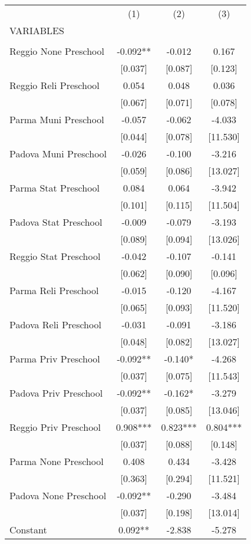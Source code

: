 \begin{tabular}{lccc} \hline
 & (1) & (2) & (3) \\
VARIABLES &  &  &  \\ \hline
 &  &  &  \\
Reggio None Preschool & -0.092** & -0.012 & 0.167 \\
 & [0.037] & [0.087] & [0.123] \\
Reggio Reli Preschool & 0.054 & 0.048 & 0.036 \\
 & [0.067] & [0.071] & [0.078] \\
Parma Muni Preschool & -0.057 & -0.062 & -4.033 \\
 & [0.044] & [0.078] & [11.530] \\
Padova Muni Preschool & -0.026 & -0.100 & -3.216 \\
 & [0.059] & [0.086] & [13.027] \\
Parma Stat Preschool & 0.084 & 0.064 & -3.942 \\
 & [0.101] & [0.115] & [11.504] \\
Padova Stat Preschool & -0.009 & -0.079 & -3.193 \\
 & [0.089] & [0.094] & [13.026] \\
Reggio Stat Preschool & -0.042 & -0.107 & -0.141 \\
 & [0.062] & [0.090] & [0.096] \\
Parma Reli Preschool & -0.015 & -0.120 & -4.167 \\
 & [0.065] & [0.093] & [11.520] \\
Padova Reli Preschool & -0.031 & -0.091 & -3.186 \\
 & [0.048] & [0.082] & [13.027] \\
Parma Priv Preschool & -0.092** & -0.140* & -4.268 \\
 & [0.037] & [0.075] & [11.543] \\
Padova Priv Preschool & -0.092** & -0.162* & -3.279 \\
 & [0.037] & [0.085] & [13.046] \\
Reggio Priv Preschool & 0.908*** & 0.823*** & 0.804*** \\
 & [0.037] & [0.088] & [0.148] \\
Parma None Preschool & 0.408 & 0.434 & -3.428 \\
 & [0.363] & [0.294] & [11.521] \\
Padova None Preschool & -0.092** & -0.290 & -3.484 \\
 & [0.037] & [0.198] & [13.014] \\
Constant & 0.092** & -2.838 & -5.278 \\

\end{tabular}
